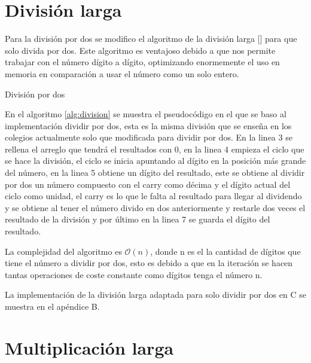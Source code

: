 \documentclass[10pt,journal,compsoc]{IEEEtran}
\begin{document}
\section{División larga}

Para la división por dos se modifico el algoritmo de la división larga [\cite{DK14}] para que solo divida por dos. Este algoritmo es ventajoso debido a que nos permite trabajar con el número dígito a dígito, optimizando enormemente el uso en memoria en comparación a usar el número como un solo entero.

\begin{algorithm}
\DontPrintSemicolon
{}

\caption{ División por dos}
\label{alg:division}
\end{algorithm}

En el algoritmo \ref{alg:division} se muestra el pseudocódigo en el que se baso al implementación dividir por dos, esta es la misma división que se enseña en los colegios actualmente solo que modificada para dividir por dos. En la linea 3 se rellena el arreglo que tendrá el resultados con 0, en la linea 4 empieza el ciclo que se hace la división, el ciclo se inicia apuntando al dígito en la posición más grande del número, en la linea 5 obtiene un dígito del resultado, este se obtiene al dividir por dos un número compuesto con el carry como décima y el dígito actual del ciclo como unidad, el carry es lo que le falta al resultado para llegar al dividendo y se obtiene al tener el número divido en dos anteriormente y restarle dos veces el resultado de la división y por último  en la linea 7 se guarda el dígito del resultado.

La complejidad del algoritmo es $\mathcal{O}(n)$, donde n es el la cantidad de dígitos que tiene el número a dividir por dos, esto es debido a que en la iteración se hacen tantas operaciones de coste constante como dígitos tenga el número n.

La implementación de la división larga adaptada para solo dividir por dos en C se muestra en el apéndice B. 


\section{Multiplicación larga}
\end{document}
